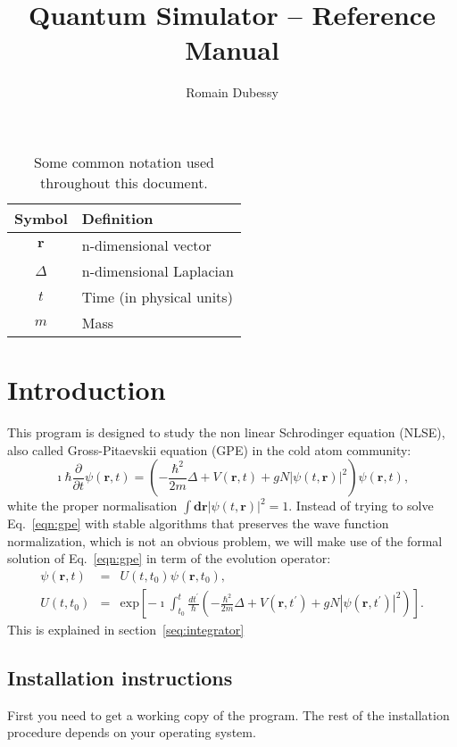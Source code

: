 \documentclass[12pt,a4paper]{report}
\author{Romain Dubessy}
\title{Quantum Simulator -- Reference Manual}
\newcommand{\abs}[1]{\left|#1\right|}
\renewcommand{\exp}[1]{\textrm{exp}\left[#1\right]}
\begin{document}
\maketitle
\cleardoublepage
\begin{table}
\begin{center}
\begin{tabular}{c|l}
Symbol & Definition \\\hline
$\bm{r}$ & n-dimensional vector\\
$\Delta$ & n-dimensional Laplacian\\
$t$ & Time (in physical units)\\
$m$ & Mass\\
\hline
\end{tabular}
\caption{\label{tab:notations}Some common notation used throughout this document.}
\end{center}
\end{table}
\cleardoublepage
\tableofcontents
\chapter{Introduction}
This program is designed to study the non linear Schrodinger equation (NLSE), also called Gross-Pitaevskii equation (GPE) in the cold atom community:
\begin{equation}
\imath\hbar\frac{\partial}{\partial t}\psi(\bm{r},t)=\left(-\frac{\hbar^2}{2m}\Delta+V(\bm{r},t)+gN\abs{\psi(t,\bm{r})}^2\right)\psi(\bm{r},t),
\label{eqn:gpe}
\end{equation}
white the proper normalisation $\int \bm{dr}\abs{\psi(t,\bm{r})}^2=1$.
Instead of trying to solve Eq.~\eqref{eqn:gpe} with stable algorithms that preserves the wave function normalization, which is not an obvious problem, we will make use of the formal solution of Eq.~\eqref{eqn:gpe} in term of the evolution operator:
\begin{subequations}
\begin{eqnarray}
\psi(\bm{r},t)&=&U(t,t_0)\psi(\bm{r},t_0),\\
U(t,t_0)&=&\exp{-\imath\int_{t_0}^t\frac{dt^\prime}{\hbar}\left(-\frac{\hbar^2}{2m}\Delta+V(\bm{r},t^\prime)+gN\abs{\psi(\bm{r},t^\prime)}^2\right)}.
\end{eqnarray}
\end{subequations}
This is explained in section~\ref{seq:integrator}

\section{Installation instructions}
First you need to get a working copy of the program.
The rest of the installation procedure depends on your operating system.
\end{document}
